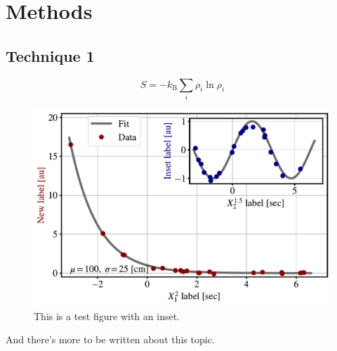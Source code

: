 \section{Methods}\label{section:methods}
\kant[5]

\subsection{Technique 1}
\kant[6]

\begin{equation}\label{eq:entropy}
S=-k_{\textrm{B}}\sum_{i}\rho_{i}\ln\rho_{i}
\end{equation}

\kant[7]

\begin{figure}[h]\label{fig:test_inset}
\begin{center}
\includegraphics[scale=0.6]{figures/test_inset.pdf}
\end{center}
\caption{This is a test figure with an inset.}
\end{figure}

\kant[8] And there's more to be written about this topic.~\cite{einstein}

